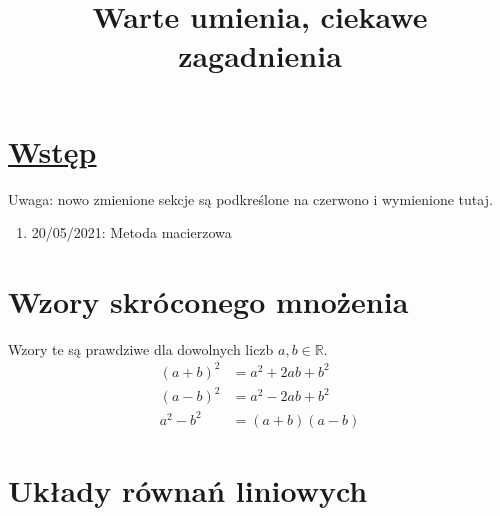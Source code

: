 \documentclass{article}
\title{Warte umienia, ciekawe zagadnienia}
\author{}
\date{}
\theoremstyle{remark}
\begin{document}
\maketitle

\tableofcontents
\section{\texorpdfstring{\ul{Wstęp}}{Wstęp}}
Uwaga: nowo zmienione sekcje są podkreślone na czerwono i wymienione tutaj.
\begin{enumerate}
  \item 20/05/2021: Metoda macierzowa
\end{enumerate}
\section{Wzory skróconego mnożenia}
Wzory te są prawdziwe dla dowolnych liczb $a, b\in \mathbb R$.
\begin{align}
  (a+b)^2&=a^2+2ab+b^2\\
  (a-b)^2&=a^2-2ab+b^2\\
  a^2-b^2&=(a+b)(a-b)
\end{align}
\section{Układy równań liniowych}
\end{document}
